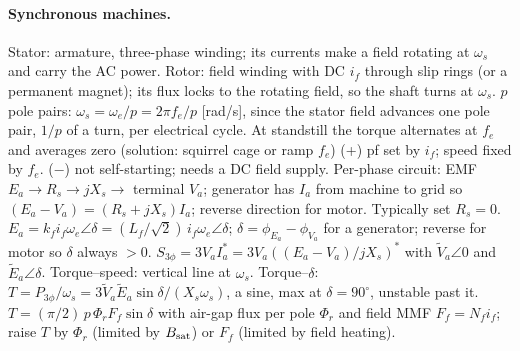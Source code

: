 \documentclass{article}
\begin{document}
\paragraph{Synchronous machines.}
Stator: armature, three-phase winding; its currents make a field rotating at $\omega_s$ and carry the AC power.
Rotor: field winding with DC $i_f$ through slip rings (or a permanent magnet); its flux locks to the rotating field, so the shaft turns at $\omega_s$.
$p$ pole pairs: $\omega_s = \omega_e/p = 2\pi f_e/p$ [rad/s], since the stator field advances one pole pair, $1/p$ of a turn, per electrical cycle.
At standstill the torque alternates at $f_e$ and averages zero (solution: squirrel cage or ramp $f_e$)
(+) pf set by $i_f$; speed fixed by $f_e$. ($-$) not self-starting; needs a DC field supply.
Per-phase circuit: EMF $E_a \to R_s \to jX_s \to$ terminal $V_a$; generator has $I_a$ from machine to grid so $(E_a - V_a) = (R_s + jX_s)I_a$; reverse direction for motor.
Typically set $R_s = 0$.
$E_a = k_f i_f\omega_e\angle\delta = (L_f/\sqrt2)\, i_f\omega_e\angle\delta$; $\delta = \phi_{E_a} - \phi_{V_a}$ for a generator; reverse for motor so $\delta$ always $> 0$.
$S_{3\phi} = 3V_aI_a^* = 3V_a((E_a - V_a)/jX_s)^*$ with $\tilde V_a\angle 0$ and $\tilde E_a\angle \delta$.
Torque--speed: vertical line at $\omega_s$.
Torque--$\delta$: $T = P_{3\phi}/\omega_s = 3\tilde V_a\tilde E_a\sin\delta/(X_s\omega_s)$, a sine, max at $\delta = 90^\circ$, unstable past it.
$T = (\pi/2)\,p\,\Phi_r F_f\sin\delta$ with air-gap flux per pole $\Phi_r$ and field MMF $F_f = N_f i_f$; raise $T$ by $\Phi_r$ (limited by $B_{\rm sat}$) or $F_f$ (limited by field heating).
\end{document}
